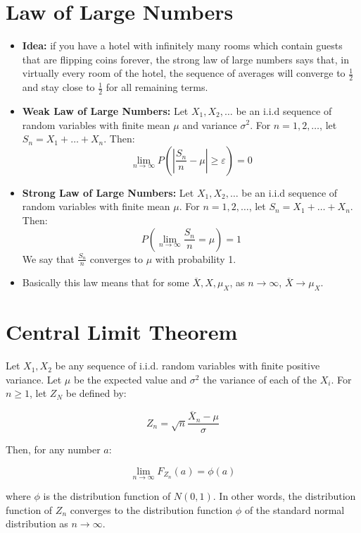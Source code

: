 \documentclass[12pt]{article}
\begin{document}
\section{Law of Large Numbers}

\begin{itemize}
	\item \textbf{Idea:} if you have a hotel with infinitely many rooms which contain
	      guests that are flipping coins forever, the strong law of large numbers
	      says that, in virtually every room of the hotel, the sequence of
	      averages will converge to $\frac{1}{2}$ and stay close to $\frac{1}{2}$
	      for all remaining terms.
	\item \textbf{Weak Law of Large Numbers:} Let $X_1, X_2, \ldots$ be an
	      i.i.d sequence of random variables with finite mean $\mu$ and
	      variance $\sigma^2$. For $n = 1, 2, \ldots$, let $S_n = X_1 + \ldots
		      + X_n$. Then:
	      \[
		      \lim_{n\to\infty} P(\left|\frac{S_n}{n} - \mu\right| \geq \varepsilon) = 0
	      \]
	\item \textbf{Strong Law of Large Numbers:} Let $X_1, X_2, \ldots$ be an
	      i.i.d sequence of random variables with finite mean $\mu$. For $n = 1,
		      2, \ldots$, let $S_n = X_1 + \ldots + X_n$. Then:
	      \[
		      P(\lim_{n \to \infty} \frac{S_n}{n} = \mu) = 1
	      \]
	      We say that $\frac{S_n}{n}$ converges to $\mu$ with probability 1.
	\item Basically this law means that for some $\overline{X}, X, \mu_X$, as
	      $n \to\infty$, $\overline{X} \to \mu_X$. \end{itemize}

\section{Central Limit Theorem}

Let $X_1, X_2$ be any sequence of i.i.d. random variables with finite positive
variance. Let $\mu$ be the expected value and $\sigma^2$ the variance of each
of the $X_i$. For $n \geq 1$, let $Z_N$ be defined by:

\[
	Z_n = \sqrt{n} \frac{\overline{X}_n - \mu}{\sigma}
\]

Then, for any number $a$:

\[
	\lim_{n\to\infty} F_{Z_n}(a) = \phi(a)
\]

where $\phi$ is the distribution function of $N(0, 1)$. In other words, the
distribution function of $Z_n$ converges to the distribution function $\phi$ of
the standard normal distribution as $n \to \infty$.
\end{document}

